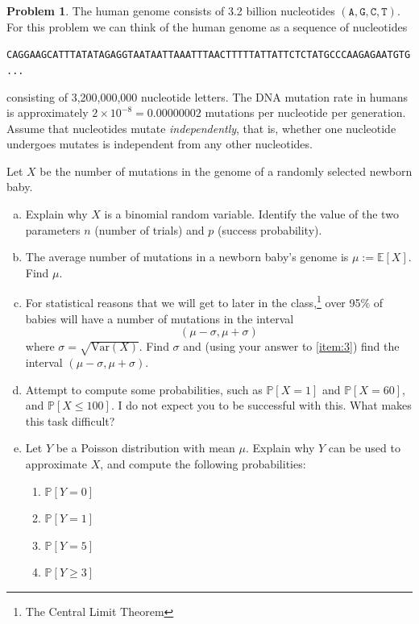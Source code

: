 \documentclass[10pt]{article}
\theoremstyle{definition}
\newtheorem{problem}[theorem]{Problem}
\newcommand{\1}[1]{\textbf{1}_{\left[#1\right]}} %
\def\E{\mathbb{E}} %
\def\P{\mathbb{P}} %
\def\Var{\mathrm{Var}} %
\begin{document}
\begin{problem}
  The human genome consists of 3.2 billion nucleotides
  $(\mathtt{A},\mathtt{G},\mathtt{C},\mathtt{T})$. For this problem we can
  think of the human genome as a sequence of nucleotides
  \begin{center}
    \texttt{CAGGAAGCATTTATATAGAGGTAATAATTAAATTTAACTTTTTATTATTCTCTATGCCCAAGAGAATGTG...}
  \end{center}
  consisting of 3,200,000,000 nucleotide letters. The DNA mutation rate in
  humans is approximately $2\times 10^{-8}=0.00000002$ mutations per
  nucleotide per generation. Assume that nucleotides mutate
  \textit{independently}, that is, whether one nucleotide undergoes mutates is
  independent from any other nucleotides.

  
  Let $X$ be the number of mutations in
  the genome of a randomly selected newborn baby.
  \begin{enumerate}[(a)]
    \item Explain why $X$ is a binomial random variable.
    Identify the value of the two parameters $n$
    (number of trials) and $p$ (success probability).
    \item \label{item:3} The average number of mutations in a newborn baby's genome is
    $\mu:=\E\left[X \right]$. Find $\mu$.
    \item  For statistical
    reasons that we will get to later in the class,\footnote{The Central Limit
      Theorem} over 95\% of babies will have a number of mutations in the
    interval
    \begin{equation*}
      (\mu-\sigma,\mu+\sigma)
    \end{equation*}
    where $\sigma = \sqrt{\Var(X)}$. Find $\sigma$ and (using your answer to
    \ref{item:3}) find the interval $(\mu-\sigma,\mu+\sigma)$.
    \item Attempt to compute some probabilities, such as $\P\left[X=1 \right]$ and $\P\left[X=60
    \right]$, and $\P\left[X \leq 100\right]$. I do not expect you to be successful with this. What
    makes this task difficult?
    \item Let $Y$ be a Poisson
    distribution with mean $\mu$. Explain why $Y$ can be used to approximate
    $X$, and compute the following probabilities:
    \begin{enumerate}[label=(\roman*)] 
      \item $\P\left[Y=0 \right]$
      \item $\P\left[Y=1 \right]$
      \item $\P\left[Y=5 \right]$
      \item $\P\left[Y \geq 3\right]$
    \end{enumerate}
  \end{enumerate}
\end{problem}
\end{document}
